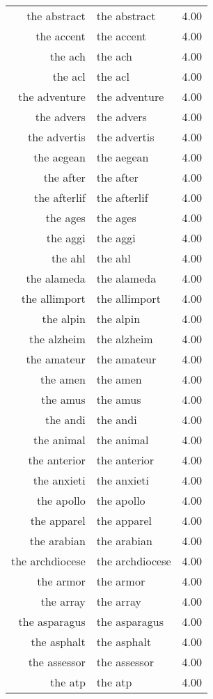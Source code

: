 \begin{table}[ht]
\begin{tabular}{rlr}
  the abstract & the abstract & 4.00 \\ 
  the accent & the accent & 4.00 \\ 
  the ach & the ach & 4.00 \\ 
  the acl & the acl & 4.00 \\ 
  the adventure & the adventure & 4.00 \\ 
  the advers & the advers & 4.00 \\ 
  the advertis & the advertis & 4.00 \\ 
  the aegean & the aegean & 4.00 \\ 
  the after & the after & 4.00 \\ 
  the afterlif & the afterlif & 4.00 \\ 
  the ages & the ages & 4.00 \\ 
  the aggi & the aggi & 4.00 \\ 
  the ahl & the ahl & 4.00 \\ 
  the alameda & the alameda & 4.00 \\ 
  the allimport & the allimport & 4.00 \\ 
  the alpin & the alpin & 4.00 \\ 
  the alzheim & the alzheim & 4.00 \\ 
  the amateur & the amateur & 4.00 \\ 
  the amen & the amen & 4.00 \\ 
  the amus & the amus & 4.00 \\ 
  the andi & the andi & 4.00 \\ 
  the animal & the animal & 4.00 \\ 
  the anterior & the anterior & 4.00 \\ 
  the anxieti & the anxieti & 4.00 \\ 
  the apollo & the apollo & 4.00 \\ 
  the apparel & the apparel & 4.00 \\ 
  the arabian & the arabian & 4.00 \\ 
  the archdiocese & the archdiocese & 4.00 \\ 
  the armor & the armor & 4.00 \\ 
  the array & the array & 4.00 \\ 
  the asparagus & the asparagus & 4.00 \\ 
  the asphalt & the asphalt & 4.00 \\ 
  the assessor & the assessor & 4.00 \\ 
  the atp & the atp & 4.00 \\ 

\end{tabular}
\end{table}
